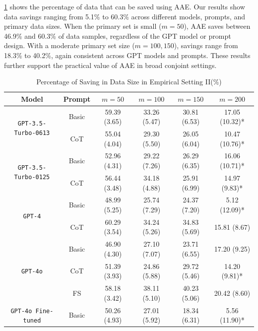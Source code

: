 \begin{table}[!t]
{\begin{minipage}{15.5cm}
\begin{tabular}{p{1cm} p{14cm}}
    \end{tabular}
  \end{minipage}}
\end{table}


\cref{tab:saving-2} shows the percentage of data that can be saved using AAE. Our results show data savings ranging from 5.1\% to 60.3\% across different models, prompts, and primary data sizes. When the primary set is small ($m=50$), AAE saves between 46.9\% and 60.3\% of data samples, regardless of the GPT model or prompt design. With a moderate primary set size ($m=100, 150$), savings range from 18.3\% to 40.2\%, again consistent across GPT models and prompts. These results further support the practical value of AAE in broad conjoint settings. 


\begin{table}[!t]
\renewcommand{\arraystretch}{1.3}
\centering
{\footnotesize
\caption{Percentage of Saving in Data Size in Empirical Setting II(\%)}
\label{tab:saving-2}
\begin{tabular}{cccccc}\hline\hline
Model    & Prompt & $m=50$          & $m=100$         & $m=150$         &$m=200$         \\\hline
\multirow{2}{*}{\texttt{GPT-3.5-Turbo-0613}} & Basic & 59.39 (3.65) & 33.26 (5.47) & 30.81 (6.53) & 17.05 (10.32)* \\
 & CoT & 55.04 (4.04) & 29.30 (5.50) & 26.05 (6.04) & 10.47 (10.76)* \\
\multirow{2}{*}{\texttt{GPT-3.5-Turbo-0125}} & Basic & 52.96 (4.31) & 29.22 (7.26) & 26.29 (6.35) & 16.06 (10.71)* \\
 & CoT & 56.44 (3.48) & 34.18 (4.88) & 25.91 (6.99) & 14.97 (9.83)* \\
\multirow{2}{*}{\texttt{GPT-4}} & Basic & 48.99 (5.25) & 25.74 (7.29) & 24.37 (7.20) & 5.12 (12.09)* \\
 & CoT & 60.29 (3.54) & 34.24 (5.26) & 34.83 (5.69) & 15.81 (8.67) \\
\multirow{3}{*}{\texttt{GPT-4o}} & Basic & 46.90 (4.30) & 27.10 (7.07) & 23.71 (6.55) & 17.20 (9.25) \\
 & CoT & 51.39 (3.93) & 24.86 (5.88) & 29.72 (5.46) & 14.20 (9.81)* \\
 & FS & 58.18 (3.42) & 38.11 (5.10) & 40.23 (5.06) & 20.42 (8.60) \\
\texttt{GPT-4o Fine-tuned} & Basic & 50.26 (4.93) & 27.01 (5.92) & 18.34 (6.31) & 5.56 (11.90)*      \\\hline\hline
\end{tabular}}
\begin{minipage}{15.5cm}

\end{minipage}
\end{table}
